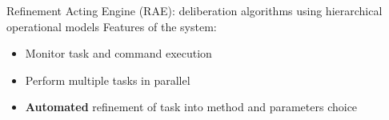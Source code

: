 \begin{frame}{Refinement Acting Engine (RAE): deliberation algorithms using hierarchical operational models}
    Features of the system:
    \begin{itemize}
        \pause
        \item Monitor task and command execution
        \pause
        \item Perform multiple tasks in parallel
          \pause
          \item \textbf{Automated} refinement of task into method and parameters choice 
      \end{itemize}
      \centering
\end{frame}

